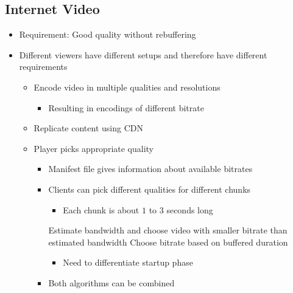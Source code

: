 \subsection{Internet Video}
\begin{itemize}
    \item Requirement: Good quality without rebuffering
    \item Different viewers have different setups and therefore have different requirements
        \begin{itemize}
            \item Encode video in multiple qualities and resolutions
                \begin{itemize}
                    \item Resulting in encodings of different bitrate
                \end{itemize}
            \item Replicate content using CDN
            \item Player picks appropriate quality
                \begin{itemize}
                    \item Manifest file gives information about available bitrates
                    \item Clients can pick different qualities for different chunks
                        \begin{itemize}
                            \item Each chunk is about $1$ to $3$ seconds long
                        \end{itemize}
                     Estimate bandwidth and choose video with smaller bitrate than estimated bandwidth
                     Choose bitrate based on buffered duration
                        \begin{itemize}
                            \item Need to differentiate startup phase
                        \end{itemize}
                    \item Both algorithms can be combined
                \end{itemize}
        \end{itemize}
\end{itemize}

